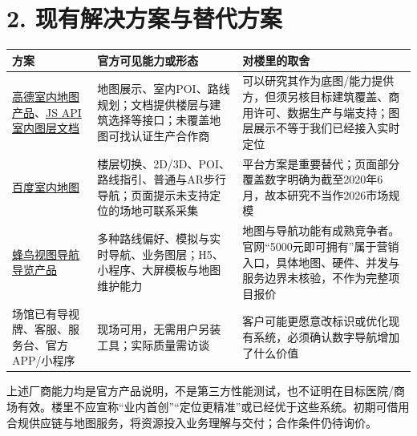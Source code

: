 \documentclass[UTF8,10pt,fontset=fandol]{ctexart}
\begin{document}
\section*{2. 现有解决方案与替代方案}
\begingroup\small\begin{longtable}{>{\raggedright\arraybackslash}p{}>{\raggedright\arraybackslash}p{}>{\raggedright\arraybackslash}p{}}
\textbf{方案} & \textbf{官方可见能力或形态} & \textbf{对楼里的取舍}\\\hline\endhead
\href{https://lbs.amap.com/product/indoorintro}{高德室内地图产品}、\href{https://a.amap.com/jsapi/static/doc/20230922/index.html}{JS API室内图层文档} & 地图展示、室内POI、路线规划；文档提供楼层与建筑选择等接口；未覆盖地图可找认证生产合作商 & 可以研究其作为底图/能力提供方，但须另核目标建筑覆盖、商用许可、数据生产与端支持；图层展示不等于我们已经接入实时定位\\\hline
\href{https://lbs.baidu.com/products/indoor}{百度室内地图} & 楼层切换、2D/3D、POI、路线指引、普通与AR步行导航；页面提示未支持定位的场地可联系采集 & 平台方案是重要替代；页面部分覆盖数字明确为截至2020年6月，故本研究不当作2026市场规模\\\hline
\href{https://www.fengmap.com/navigation/}{蜂鸟视图导航导览产品} & 多种路线偏好、模拟与实时导航、业务图层；H5、小程序、大屏模板与地图维护能力 & 地图与导航功能有成熟竞争者。官网“5000元即可拥有”属于营销入口，具体地图、硬件、并发与服务边界未核验，不作为完整项目报价\\\hline
场馆已有导视牌、客服、服务台、官方APP/小程序 & 现场可用，无需用户另装工具；实际质量需访谈 & 客户可能更愿意改标识或优化现有系统，必须确认数字导航增加了什么价值\\\hline
\end{longtable}\endgroup
上述厂商能力均是官方产品说明，不是第三方性能测试，也不证明在目标医院/商场有效。楼里不应宣称“业内首创”“定位更精准”或已经优于这些系统。初期可借用合规供应链与地图服务，将资源投入业务理解与交付；合作条件仍待询价。\par
\end{document}
